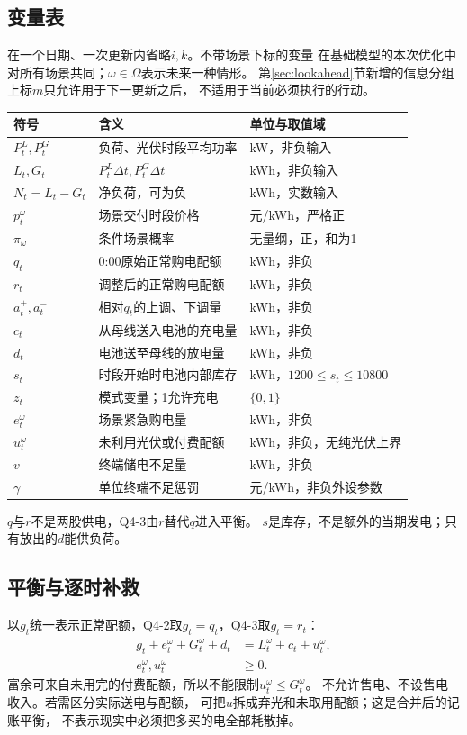 \documentclass[UTF8,11pt]{ctexart}
\begin{document}
\subsection{变量表}
在一个日期、一次更新内省略$i,k$。不带场景下标的变量
在基础模型的本次优化中对所有场景共同；$\omega\in\Omega$表示未来一种情形。
第\ref{sec:lookahead}节新增的信息分组上标$m$只允许用于下一更新之后，
不适用于当前必须执行的行动。
\begin{longtable}{p{2.4cm}p{6.8cm}p{4.6cm}}
\toprule 符号 & 含义 & 单位与取值域\\ \midrule
\endhead
$P^L_t,P^G_t$ & 负荷、光伏时段平均功率 & kW，非负输入\\
$L_t,G_t$ & $P^L_t\Delta t,P^G_t\Delta t$ & kWh，非负输入\\
$N_t=L_t-G_t$ & 净负荷，可为负 & kWh，实数输入\\
$p_t^\omega$ & 场景交付时段价格 & 元/kWh，严格正\\
$\pi_\omega$ & 条件场景概率 & 无量纲，正，和为1\\
$q_t$ & 0:00原始正常购电配额 & kWh，非负\\
$r_t$ & 调整后的正常购电配额 & kWh，非负\\
$a_t^+,a_t^-$ & 相对$q_t$的上调、下调量 & kWh，非负\\
$c_t$ & 从母线送入电池的充电量 & kWh，非负\\
$d_t$ & 电池送至母线的放电量 & kWh，非负\\
$s_t$ & 时段开始时电池内部库存 & kWh，$1200\leq s_t\leq10800$\\
$z_t$ & 模式变量；1允许充电 & $\{0,1\}$\\
$e_t^\omega$ & 场景紧急购电量 & kWh，非负\\
$u_t^\omega$ & 未利用光伏或付费配额 & kWh，非负，无纯光伏上界\\
$v$ & 终端储电不足量 & kWh，非负\\
$\gamma$ & 单位终端不足惩罚 & 元/kWh，非负外设参数\\
\bottomrule
\end{longtable}
$q$与$r$不是两股供电，Q4-3由$r$替代$q$进入平衡。
$s$是库存，不是额外的当期发电；只有放出的$d$能供负荷。

\subsection{平衡与逐时补救}
以$g_t$统一表示正常配额，Q4-2取$g_t=q_t$，Q4-3取$g_t=r_t$：
\begin{align}
 g_t+e_t^\omega+G_t^\omega+d_t
   &=L_t^\omega+c_t+u_t^\omega,\label{eq:balance}\\
 e_t^\omega,u_t^\omega&\geq0.
\end{align}
富余可来自未用完的付费配额，所以不能限制$u_t^\omega\leq G_t^\omega$。
不允许售电、不设售电收入。若需区分实际送电与配额，
可把$u$拆成弃光和未取用配额；这是合并后的记账平衡，
不表示现实中必须把多买的电全部耗散掉。
\end{document}
